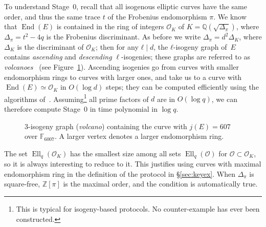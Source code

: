 \documentclass{llncs}
\newcommand{\F}{\mathbb{F}}
\renewcommand{\O}{\mathcal{O}}
\DeclareMathOperator{\End}{End}
\DeclareMathOperator{\Ell}{Ell}
\begin{document}
To understand Stage~0, recall that all isogenous elliptic curves have
the same order, and thus the same trace $t$ of the Frobenius
endomorphism $π$. 
We know that
$\End(E)$ is contained in the ring of integers $\O_K$ of
$K=ℚ(\sqrt{Δ_π})$,
where $Δ_π=t^2-4q$ is the Frobenius discriminant.
As before we write $Δ_π=d^2Δ_K$, where $Δ_K$ is the
discriminant
of $\O_K$; then for any $ℓ\mid d$, the
$ℓ$-isogeny graph of~$E$ contains \emph{ascending} and
\emph{descending} $\ell$-isogenies; 
these graphs are referred to as 
\emph{volcanoes}~\cite{fouquet+morain02} (see Figure~\ref{fig:volcano}).
Ascending isogenies go from curves with smaller endomorphism rings to
curves with larger ones, and take us to a curve with $\End(E)≃\O_K$ in
$O(\log d)$ steps; they can be computed efficiently using the
algorithms
of~\cite{kohel,fouquet+morain02,ionica+joux13,defeo2016explicit}.
Assuming\footnote{%
    This is typical for isogeny-based protocols.
    No counter-example has ever been constructed.
}
all prime factors of $d$ are in $O(\log q)$,
we can therefore compute Stage~0
in time polynomial in $\log q$.

\begin{figure}
  \centering
  \caption{$3$-isogeny graph (\emph{volcano}) containing the curve
    with $j(E)=607$ over $\F_{6007}$. A larger vertex denotes a larger
    endomorphism ring.}
  \label{fig:volcano}
\end{figure}

The set $\Ell_q(\O_K)$ has the smallest size among all sets
$\Ell_q(\O)$ for $\O⊂\O_K$, so it is always interesting to
reduce to it. This justifies using curves with maximal endomorphism
ring in the definition of the protocol in
\S\ref{sec:keyex}. When $Δ_π$ is square-free, $ℤ[π]$
is the maximal order, and the condition is automatically true.
\end{document}
